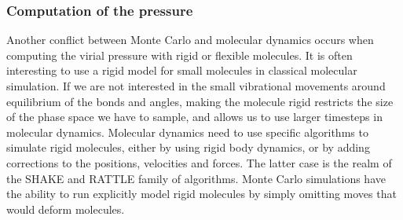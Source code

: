 \documentclass[thesis]{subfiles}
\begin{document}
\begin{figure}[ht]
    \centering
    \caption{\TODO}
    \label{fig:mc-cache}
\end{figure}

\subsubsection{Computation of the pressure}

Another conflict between Monte Carlo and molecular dynamics occurs when
computing the virial pressure with rigid or flexible molecules. It is often
interesting to use a rigid model for small molecules in classical molecular
simulation. If we are not interested in the small vibrational movements around
equilibrium of the bonds and angles, making the molecule rigid restricts the
size of the phase space we have to sample, and allows us to use larger timesteps
in molecular dynamics. Molecular dynamics need to use specific algorithms to
simulate rigid molecules, either by using rigid body dynamics, or by adding
corrections to the positions, velocities and forces. The latter case is the
realm of the SHAKE and RATTLE family of algorithms\cite{Ryckaert1977,
Andersen1983}. Monte Carlo simulations have the ability to run explicitly model
rigid molecules by simply omitting moves that would deform molecules.
\end{document}
